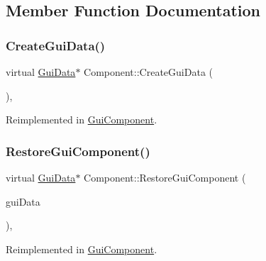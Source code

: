 \subsection{Member Function Documentation}
\mbox{\label{class_component_a634070ac3118a22828bd3c130f27cf2a}} 
\subsubsection{\texorpdfstring{CreateGuiData()}{CreateGuiData()}}
{\footnotesize\ttfamily virtual \mbox{\hyperlink{class_gui_data}{Gui\+Data}}$\ast$ Component\+::\+Create\+Gui\+Data (\begin{DoxyParamCaption}{ }\end{DoxyParamCaption})\hspace{0.3cm}{\ttfamily [inline]}, {\ttfamily [virtual]}}



Reimplemented in \mbox{\hyperlink{class_gui_component_a11b7920b50fe9e10a7f2450a79e03647}{Gui\+Component}}.

\mbox{\label{class_component_a0a1e8b4aaa523ad8b6460ff35dd6c584}} 
\subsubsection{\texorpdfstring{RestoreGuiComponent()}{RestoreGuiComponent()}}
{\footnotesize\ttfamily virtual \mbox{\hyperlink{class_gui_data}{Gui\+Data}}$\ast$ Component\+::\+Restore\+Gui\+Component (\begin{DoxyParamCaption}\item[{\mbox{\hyperlink{class_gui_data}{Gui\+Data}} $\ast$}]{gui\+Data }\end{DoxyParamCaption})\hspace{0.3cm}{\ttfamily [inline]}, {\ttfamily [virtual]}}



Reimplemented in \mbox{\hyperlink{class_gui_component_a6721cce20f5628d9413784b10a48b359}{Gui\+Component}}.

\mbox{\label{class_component_a2d6c81535df008c6788ba21d0812ed44}} 
